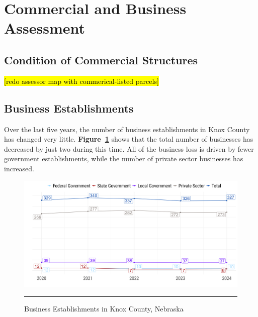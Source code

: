 \section{Commercial and Business Assessment}

\subsection{Condition of Commercial Structures}

\noindent \hl{[redo assessor map with commerical-listed parcels]}

\subsection{Business Establishments}

\noindent Over the last five years, the number of business establishments in Knox County has changed very little. \textbf{Figure~\ref{fig:bizEstablishments}} shows that the total number of businesses has decreased by just two during this time. All of the business loss is driven by fewer government establishments, while the number of private sector businesses has increased.

\begin{figure}[ht!]
\centering
\begin{framed}
    \caption{Business Establishments in Knox County, Nebraska}
    \label{fig:bizEstablishments}
    \includegraphics[width=\linewidth]{figures/knox_county_employers.png}
    \rule[-5pt]{\linewidth}{0.4pt}
\end{framed}
\end{figure}


